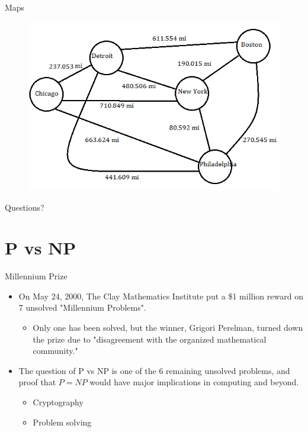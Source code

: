 \documentclass[aspectratio=169, handout]{beamer}
\begin{document}
\begin{frame}{Maps}
    \begin{figure}
        \centering
        \includegraphics[width=0.75\linewidth]{map_graph.png}
    \end{figure}
\end{frame}


\begin{frame}{}
      \begin{center}
    {\color{sigma@mainblue} \LARGE Questions?}
  \end{center}
\end{frame}


\section{P vs NP}
\frame{\sectionpage}

\begin{frame}{Millennium Prize}
    \begin{itemize}
        \item On May 24, 2000, The Clay Mathematics Institute put a \$1 million reward on 7 unsolved "Millennium Problems". \pause
        \begin{itemize}
            \item Only one has been solved, but the winner, Grigori Perelman, turned down the prize due to "disagreement with the organized mathematical community."
        \end{itemize} \pause
        \item The question of P vs NP is one of the 6 remaining unsolved problems, and proof that $P = NP$ would have major implications in computing and beyond. \pause
        \begin{itemize}
            \item Cryptography
            \item Problem solving
        \end{itemize}
    \end{itemize}
\end{frame}
\end{document}
